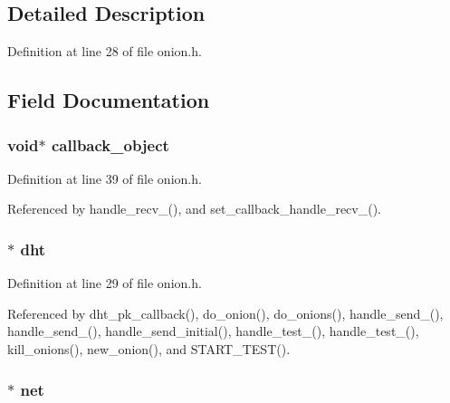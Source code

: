 \subsection{Detailed Description}


Definition at line 28 of file onion.\+h.



\subsection{Field Documentation}
\hypertarget{struct_onion_aa30dff385b8f119ddb95900b2a250a08}{
\subsubsection[{callback\+\_\+object}]{\setlength{\rightskip}{0pt plus 5cm}void$\ast$ callback\+\_\+object}}\label{struct_onion_aa30dff385b8f119ddb95900b2a250a08}


Definition at line 39 of file onion.\+h.



Referenced by handle\+\_\+recv\+\_(), and set\+\_\+callback\+\_\+handle\+\_\+recv\+\_().

\hypertarget{struct_onion_a8b3d6ce8745acc52695e252bdb1531b6}{
\subsubsection[{dht}]{$\ast$ dht}}\label{struct_onion_a8b3d6ce8745acc52695e252bdb1531b6}


Definition at line 29 of file onion.\+h.



Referenced by dht\+\_\+pk\+\_\+callback(), do\+\_\+onion(), do\+\_\+onions(), handle\+\_\+send\+\_(), handle\+\_\+send\+\_(), handle\+\_\+send\+\_\+initial(), handle\+\_\+test\+\_(), handle\+\_\+test\+\_(), kill\+\_\+onions(), new\+\_\+onion(), and S\+T\+A\+R\+T\+\_\+\+T\+E\+S\+T().

\hypertarget{struct_onion_aa14ea2f67950f57fe4235d7375a2216c}{
\subsubsection[{net}]{$\ast$ net}}\label{struct_onion_aa14ea2f67950f57fe4235d7375a2216c}


